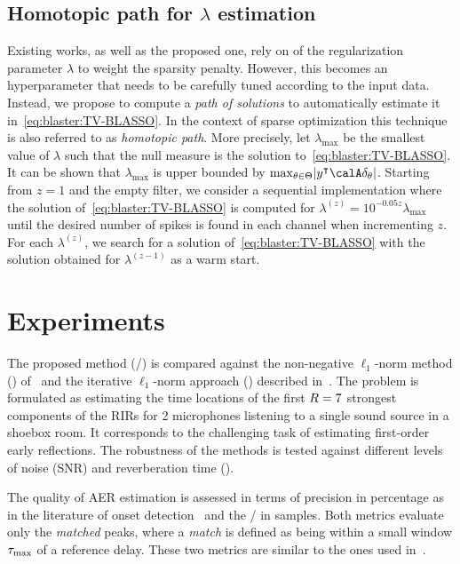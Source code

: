 \subsection{Homotopic path for $\lambda$ estimation}\label{sec:blaster:lambda}
Existing works, as well as the proposed one, rely on of the regularization parameter $\lambda$ to weight the sparsity penalty.
However, this becomes an hyperparameter that needs to be carefully tuned according to the input data.
Instead, we propose to compute a \textit{path of solutions} to automatically estimate it in~\cref{eq:blaster:TV-BLASSO}.
In the context of sparse optimization this technique is also referred to as \textit{homotopic path}.
More precisely, let $\lambda_{\max}$ be the smallest value of $\lambda$ such that the null measure is the solution to~\cref{eq:blaster:TV-BLASSO}.
It can be shown that $\lambda_{\max}$ is upper bounded by $\max_{\theta\in\Theta} \kvbar{y^\intercal\opObs\delta_\theta}$.
Starting from $z=1$ and the empty filter, we consider a sequential implementation where the solution of~\cref{eq:blaster:TV-BLASSO} is computed for $\lambda^{(z)}= 10^{-0.05z}\lambda_{\max}$ until the desired number of spikes is found in each channel when incrementing $z$.
For each $\lambda^{(z)}$, we search for a solution of~\cref{eq:blaster:TV-BLASSO} with the solution obtained for $\lambda^{(z-1)}$ as a warm start.

\section{Experiments}\label{sec:blaster:exp}
The proposed method (\BLASTER/) is compared against the non-negative $\ell_1$-norm method (\algoBsn) of~ and the iterative $\ell_1$-norm approach (\algoCrocco) described in~.
The problem is formulated as estimating the time locations of the first $R=7$ strongest components of the RIRs for 2 microphones listening to a single sound source in a shoebox room. It corresponds to the challenging task of estimating first-order early reflections.
The robustness of the methods is tested against different levels of noise (SNR) and reverberation time (\RT{}).

\mynewline
The quality of AER estimation is assessed in terms of precision
in percentage as in the literature of onset detection~ and the \RMSEtxt/ in samples.
Both metrics evaluate only the \textit{matched} peaks, where a \textit{match} is defined as being within a small window $\tau_\text{max}$ of a reference delay.
These two metrics are similar to the ones used in~.

